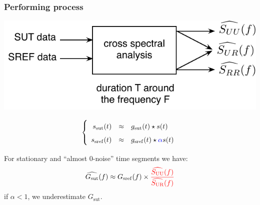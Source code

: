 \documentclass[handout,9pt]{beamer}
\def\sut{\mathrm{sut}}
\def\sref{\mathrm{sref}}
\begin{document}
\begin{frame}
\frametitle{Performing process}

\begin{center}
\includegraphics[scale=0.66]{processdetail.pdf}
\end{center}

\vspace{-0.5cm}

\begin{eqnarray*}
\left\{
\renewcommand\arraystretch{1.6}
\begin{array}{rcl}
s_{\sut}(t)&\approx&g_{\sut}(t)\star s(t) 
\\
s_{\sref}(t)&\approx&g_{\sref}(t)\star {\color{blue}\alpha} s(t)
\end{array}\right.
\end{eqnarray*}

For stationary and ``almost 0-noise'' time segments we have:
\begin{eqnarray*}
\widehat{G_{\sut}}(f)
\approx G_{\sref}(f) \times
\color{red}\frac{\widehat{{S}_{\mathrm{UU}}}(f)}
                        {\widehat{{S}_{\mathrm{UR}}}(f)}
\end{eqnarray*}
if $\alpha<1$, we underestimate $G_{\sut}$.


\end{frame}
\end{document}
